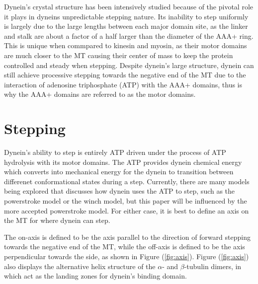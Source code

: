 Dynein's crystal structure has been intensively studied because of the pivotal role it plays in dyneins unpredictable stepping nature. Its inability to step uniformly is largely due to the large lengths between each major domain site, as the linker and stalk are about a factor of a half larger than the diameter of the AAA+ ring. This is unique when commpared to kinesin and myosin, as their motor domains are much closer to the MT causing their center of mass to keep the protein controlled and steady when stepping. Despite dynein's large structure, dynein can still achieve processive stepping towards the negative end of the MT due to the interaction of adenosine triphosphate (ATP) with the AAA+ domains, thus is why the AAA+ domains are referred to as the motor domains.





\section{Stepping}

Dynein's ability to step is entirely ATP driven under the process of ATP hydrolysis with its motor domains. The ATP provides dynein chemical energy which converts into mechanical energy for the dynein to transition between differenet conformational states during a step. Currently, there are many models being explored that discusses how dynein uses the ATP to step, such as the powerstroke model or the winch model, but this paper will be influenced by the more accepted powerstroke model. For either case, it is best to define an axis on the MT for where dynein can step. 

The on-axis is defined to be the axis parallel to the direction of forward stepping towards the negative end of the MT, while the off-axis is defined to be the axis perpendicular towards the side, as shown in Figure (\ref{fig:axis}). Figure (\ref{fig:axis}) also displays the alternative helix structure of the $\alpha$- and $\beta$-tubulin dimers, in which act as the landing zones for dynein's binding domain.  

